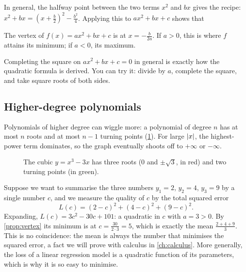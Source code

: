 In general, the halfway point between the two terms $x^2$ and $bx$ gives the
recipe: $x^2 + bx = \left(x + \tfrac b2\right)^2 - \tfrac{b^2}{4}$. Applying
this to $ax^2 + bx + c$ shows that

\begin{proposition}\label{prop:vertex}
The vertex of $f(x) = ax^2 + bx + c$ is at $x = -\frac{b}{2a}$. If $a > 0$,
this is where $f$ attains its minimum; if $a < 0$, its maximum.
\end{proposition}

\begin{remark}
Completing the square on $ax^2 + bx + c = 0$ in general is exactly how the
quadratic formula is derived. You can try it: divide by $a$, complete the
square, and take square roots of both sides.
\end{remark}

\subsection{Higher-degree polynomials}

Polynomials of higher degree can wiggle more: a polynomial of degree $n$ has
at most $n$ roots and at most $n - 1$ turning points
(\cref{fig:cubic}). For large $\lvert x\rvert$, the highest-power term dominates, so
the graph eventually shoots off to $+\infty$ or $-\infty$.

\begin{figure}[htbp]
\centering
{}
\caption{The cubic $y = x^3 - 3x$ has three roots ($0$ and $\pm\sqrt3$, in red)
  and two turning points (in green).}
\label{fig:cubic}
\end{figure}

\begin{mlnote}
Suppose we want to summarise the three numbers $y_1 = 2$, $y_2 = 4$, $y_3 = 9$
by a single number $c$, and we measure the quality of $c$ by the total squared
error
\[
  L(c) = (2 - c)^2 + (4 - c)^2 + (9 - c)^2 .
\]
Expanding, $L(c) = 3c^2 - 30c + 101$: a quadratic in $c$ with $a = 3 > 0$. By
\cref{prop:vertex} its minimum is at $c = \frac{30}{2\cdot3} = 5$, which is
exactly the mean $\frac{2 + 4 + 9}{3}$. This is no coincidence: the mean is
always the number that minimises the squared error, a fact we will prove with
calculus in \cref{ch:calculus}. More generally, the loss of a linear regression
model is a quadratic function of its parameters, which is why it is so easy to
minimise.
\end{mlnote}

